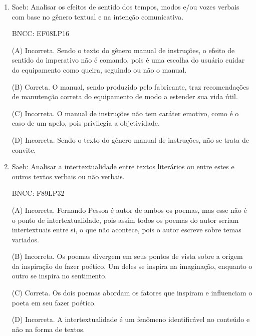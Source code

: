 \begin{enumerate}
(C) Incorreta. O goleiro é tido como um jogador confiável, como se
percebe nos termos porteiro, guarda-metas, arqueiro, guardião, até que
cometa um erro, pois segundo o autor ele pode perder a confiabilidade
num único lance. Não se trata do efeito de humor do texto.

(D) Incorreta. Os jogadores de linha não são exaltados, eles são citados
para fins de comparação do quanto um goleiro precisa fazer para ser
reconhecido ou para recuperar esse reconhecimento perante a torcida.


\item

Saeb: Analisar os efeitos de sentido dos tempos, modos e/ou vozes
verbais com base no gênero textual e na intenção comunicativa.

BNCC: EF08LP16

(A) Incorreta. Sendo o texto do gênero manual de instruções, o efeito de
sentido do imperativo não é comando, pois é uma escolha do usuário
cuidar do equipamento como queira, seguindo ou não o manual.

(B) Correta. O manual, sendo produzido pelo fabricante, traz
recomendações de manutenção correta do equipamento de modo a estender
sua vida útil.

(C) Incorreta. O manual de instruções não tem caráter emotivo, como é o
caso de um apelo, pois privilegia a objetividade.

(D) Incorreta. Sendo o texto do gênero manual de instruções, não se
trata de convite.


\item


Saeb: Analisar a intertextualidade entre textos literários ou entre
estes e outros textos verbais ou não verbais.

BNCC: F89LP32

(A) Incorreta. Fernando Pessoa é autor de ambos os poemas, mas esse não
é o ponto de intertextualidade, pois assim todos os poemas do autor
seriam intertextuais entre si, o que não acontece, pois o autor escreve
sobre temas variados.

(B) Incorreta. Os poemas divergem em seus pontos de vista sobre a origem
da inspiração do fazer poético. Um deles se inspira na imaginação,
enquanto o outro se inspira no sentimento.

(C) Correta. Os dois poemas abordam os fatores que inspiram e
influenciam o poeta em seu fazer poético.

(D) Incorreta. A intertextualidade é um fenômeno identificável no
conteúdo e não na forma de textos.


\end{enumerate}
